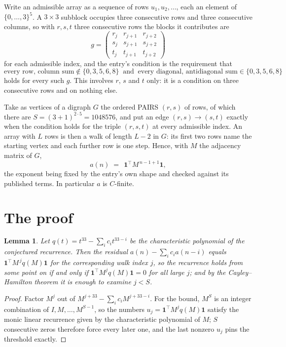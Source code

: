 \documentclass[11pt,a4paper]{article}
\theoremstyle{plain}
\newtheorem{lemma}[theorem]{Lemma}
\theoremstyle{definition}
\begin{document}
Write an admissible array as a sequence of rows $u_1,u_2,\dots$, each an element of
$\{0,\dots,3\}^{5}$. A $3\times3$ subblock occupies three consecutive rows and
three consecutive columns, so with $r,s,t$ three consecutive rows the blocks it
contributes are
\[
g=\begin{pmatrix}r_j&r_{j+1}&r_{j+2}\\ s_j&s_{j+1}&s_{j+2}\\ t_j&t_{j+1}&t_{j+2}\end{pmatrix}
\]
for each admissible index, and the entry's condition is the requirement that
\[
\text{every row, column sum} \notin \{0,3,5,6,8\}\ \text{ and }\ \text{every diagonal, antidiagonal sum} \in \{0,3,5,6,8\}
\]
holds for every such $g$. This involves $r$, $s$ and $t$ only: it is a condition on
three consecutive rows and on nothing else.

Take as vertices of a digraph $G$ the ordered PAIRS $(r,s)$ of rows, of which there are
$S=(3+1)^{2\cdot5}=1048576$, and put an edge $(r,s)\to(s,t)$ exactly when the condition
holds for the triple $(r,s,t)$ at every admissible index. An array with $L$ rows is then a
walk of length $L-2$ in $G$: its first two rows name the starting vertex and each further
row is one step. Hence, with $M$ the adjacency matrix of $G$,
\[
a(n)\;=\;\,\mathbf{1}^{\!\top}M^{\,n-1+1}\mathbf{1},
\]
the exponent being fixed by the entry's own shape and checked against its published terms.
In particular $a$ is $C$-finite.

\section{The proof}

\begin{lemma}\label{lem:crit}
Let $q(t)=t^{33}-\sum_i c_it^{33-i}$ be the characteristic polynomial of the
conjectured recurrence. Then the residual $a(n)-\sum_ic_ia(n-i)$ equals
$\mathbf{1}^{\!\top}M^{\,j}q(M)\mathbf{1}$ for the corresponding walk index
$j$, so the recurrence holds from some point on if and only if
$\mathbf{1}^{\!\top}M^{j}q(M)\mathbf{1}=0$ for all large $j$; and by the
Cayley--Hamilton theorem it is enough to examine $j<S$.
\end{lemma}

\begin{proof}
Factor $M^{j}$ out of $M^{j+33}-\sum_ic_iM^{j+33-i}$. For the bound, $M^{S}$
is an integer combination of $I,M,\dots,M^{S-1}$, so the numbers
$u_j=\mathbf{1}^{\!\top}M^{j}q(M)\mathbf{1}$ satisfy the monic linear recurrence given by
the characteristic polynomial of $M$; $S$ consecutive zeros therefore force every later one,
and the last nonzero $u_j$ pins the threshold exactly.
\end{proof}
\end{document}
